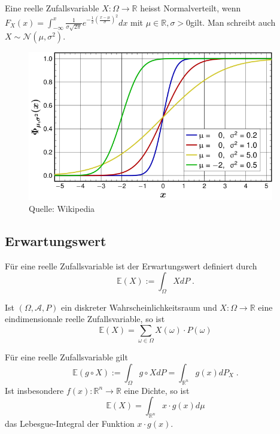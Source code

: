 \begin{Definition}[Normalverteilung]
Eine reelle Zufallsvariable $X: \Omega \to \mathbb{R}$ heisst Normalverteilt, wenn 
$F_X (x) = \int_{- \infty}^{x}  \frac 1{\sigma \sqrt{2\pi}}e^{- \frac {1}{2} (\frac{x- \mu}{ \sigma})^2}dx$ mit  $\mu \in \mathbb{R}, \sigma > 0 $gilt. Man schreibt auch $X \sim \mathcal{N}(\mu, \sigma^2)$.
\end{Definition}
\begin{figure}[htp]
      \centering
    \includegraphics[width=0.96\textwidth]{images/normal_distribution}
      \caption{Quelle: Wikipedia}
\end{figure}


\subsection{Erwartungswert}


\begin{Definition}
Für eine reelle Zufallsvariable ist der Erwartungswert definiert durch
$$ \mathbb{E} (X) := \int_{\Omega} X dP \; .$$
\end{Definition}




\begin{Bemerkung}
Ist $(\Omega, \mathcal{A}, P)$ ein diskreter Wahrscheinlichkeitsraum und $X :\Omega \to \mathbb{R}$ eine eindimensionale reelle Zufallsvariable, so ist
$$ \mathbb{E} (X) = \sum_{\omega \in \Omega}  X(\omega) \cdot P(\omega)$$
\end{Bemerkung}


\begin{Satz}
Für eine reelle Zufallsvariable gilt
$$ \mathbb{E} (g \circ X) := \int_{\Omega} g \circ X dP = \int_{\mathbb{R}^n}  g(x)  dP_X \;. $$
Ist insbesondere $f(x) : \mathbb{R}^n \to \mathbb{R}$ eine Dichte, so ist  
$$\mathbb{E} (X) =  \int_{\mathbb{R}^n} x \cdot g(x) d\mu$$ das Lebesgue-Integral der Funktion $x \cdot g(x)$.
\end{Satz}

